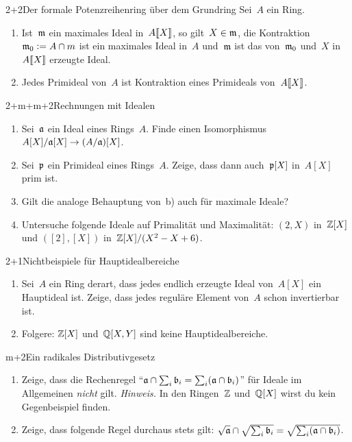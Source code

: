 \documentclass[entwurf]{uebblatt}
\begin{document}

\begin{aufgabe}{2+2}{Der formale Potenzreihenring über dem Grundring}
Sei~$A$ ein Ring.
\begin{enumerate}
\item Ist~$\mathfrak{m}$ ein maximales Ideal in~${A}\llbracket{X}\rrbracket$, so gilt~$X \in \mathfrak{m}$, die
Kontraktion~$\mathfrak{m}_0 \vcentcolon= A \cap m$ ist ein maximales Ideal in~$A$ und~$\mathfrak{m}$
ist das von~$\mathfrak{m}_0$ und~$X$ in~${A}\llbracket{X}\rrbracket$ erzeugte Ideal.
\item Jedes Primideal von~$A$ ist Kontraktion eines Primideals von~${A}\llbracket{X}\rrbracket$.
\end{enumerate}
\end{aufgabe}

\begin{aufgabe}{2+m+m+2}{Rechnungen mit Idealen}
\begin{enumerate}
\item Sei~$\mathfrak{a}$ ein Ideal eines Rings~$A$. Finde einen
Isomorphismus~$A[X]/\mathfrak{a}[X] \to (A/\mathfrak{a})[X]$.
\item Sei~$\mathfrak{p}$ ein Primideal eines Rings~$A$. Zeige, dass dann auch~$\mathfrak{p}[X]$
in~$A[X]$ prim ist.
\item Gilt die analoge Behauptung von~b) auch für maximale Ideale?
\item Untersuche folgende Ideale auf Primalität und Maximalität:
$(2, X)$ in~$\mathbb{Z}[X]$ und $([2], [X])$ in~$\mathbb{Z}[X]/(X^2 - X + 6)$.
\end{enumerate}
\end{aufgabe}

\begin{aufgabe}{2+1}{Nichtbeispiele für Hauptidealbereiche}
\begin{enumerate}
\item Sei~$A$ ein Ring derart, dass jedes endlich erzeugte Ideal von~$A[X]$ ein
Hauptideal ist. Zeige, dass jedes reguläre Element von~$A$ schon invertierbar
ist.
\item Folgere: $\mathbb{Z}[X]$ und~$\mathbb{Q}[X,Y]$ sind keine Hauptidealbereiche.
\end{enumerate}
\end{aufgabe}

\begin{aufgabe}{m+2}{Ein radikales Distributivgesetz}
\begin{enumerate}
\item Zeige, dass die Rechenregel
"`$\mathfrak{a} \cap \sum_i \mathfrak{b}_i = \sum_i (\mathfrak{a} \cap \mathfrak{b}_i)$"'
für Ideale im Allgemeinen \emph{nicht} gilt. \emph{Hinweis.} In den
Ringen~$\mathbb{Z}$ und~$\mathbb{Q}[X]$ wirst du kein Gegenbeispiel finden.
\item Zeige, dass folgende Regel durchaus stets gilt:
$\sqrt{\mathfrak{a}} \cap \sqrt{\sum_i \mathfrak{b}_i} = \sqrt{\sum_i (\mathfrak{a} \cap \mathfrak{b}_i)}$.
\end{enumerate}
\end{aufgabe}
\end{document}

